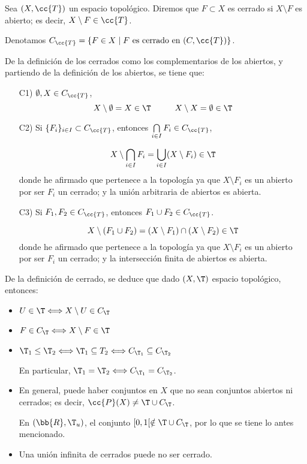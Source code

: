 \begin{definicion} Sea $(X,\cc{T})$ un espacio topológico. Diremos que $F\subset X$ es cerrado si $X\setminus F$ es abierto; es decir, $X\setminus F\in \cc{T}$.

Denotamos $C_{\cc{T}}=\{F\in X\mid F \text{ es cerrado en } (C,\cc{T})\}$.
\end{definicion}

De la definición de los cerrados como los complementarios de los abiertos, y partiendo de la definición de los abiertos, se tiene que:
\begin{enumerate}
    \item[C1)] $\emptyset, X\in C_{\cc{T}}$,
    $$X\setminus \emptyset = X\in \T \hspace{1cm} X\setminus X=\emptyset\in \T$$
    
    \item[C2)] Si $\{F_i\}_{i\in I}\subset C_{\cc{T}}$, entonces $\bigcap\limits_{i\in I}F_i\in C_{\cc{T}}$,

    \begin{equation*}
        X\setminus \bigcap\limits_{i\in I}F_i = \bigcup\limits_{i\in I}(X\setminus F_i) \in \T
    \end{equation*}
    donde he afirmado que pertenece a la topología ya que $X\setminus F_i$ es un abierto por ser $F_i$ un cerrado; y la unión arbitraria de abiertos es abierta.
    
    \item[C3)] Si $F_1,F_2\in C_{\cc{T}}$, entonces $F_1\cup F_2\in C_{\cc{T}}$.

    $$X\setminus (F_1\cup F_2) = (X\setminus F_1)\cap (X\setminus F_2)\in \T$$
    donde he afirmado que pertenece a la topología ya que $X\setminus F_i$ es un abierto por ser $F_i$ un cerrado; y la intersección finita de abiertos es abierta.
    
\end{enumerate}

De la definición de cerrado, se deduce que dado $(X,\T)$ espacio topológico, entonces:
\begin{itemize}
    \item $U\in \T\Longleftrightarrow X\setminus U\in C_\T$
    \item $F\in C_\T \Longleftrightarrow X\setminus F\in \T$
    \item $\T_1\leq \T_2 \Longleftrightarrow \T_1\subseteq T_2 \Longleftrightarrow C_{\T_1}\subseteq C_{\T_2}$

    En particular, $\T_1=\T_2\Longleftrightarrow C_{\T_1}=C_{\T_2}$.

    \item En general, puede haber conjuntos en $X$ que no sean conjuntos abiertos ni cerrados; es decir, $\cc{P}(X)\neq \T\cup C_\T$.

    En $(\bb{R},\T_u)$, el conjunto $[0,1[\notin \T\cup C_\T$, por lo que se tiene lo antes mencionado.

    \item Una unión infinita de cerrados puede no ser cerrado.
\end{itemize}

